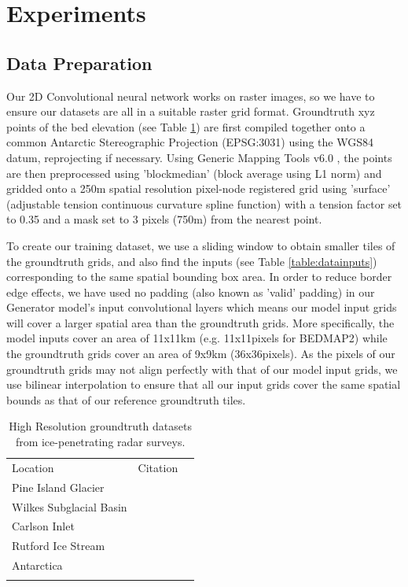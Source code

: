 \documentclass[tc, manuscript]{copernicus}
\begin{document}
\section{Experiments}

\subsection{Data Preparation}

Our 2D Convolutional neural network works on raster images, so we have to ensure our datasets are all in a suitable raster grid format.
Groundtruth xyz points of the bed elevation (see Table \ref{table:groundtruth}) are first compiled together onto a common Antarctic Stereographic Projection (EPSG:3031) using the WGS84 datum, reprojecting if necessary.
Using Generic Mapping Tools v6.0 \citep{WesselGenericMappingTools2019}, the points are then preprocessed using 'blockmedian' (block average using L1 norm) and gridded onto a 250m spatial resolution pixel-node registered grid using 'surface' (adjustable tension continuous curvature spline function) with a tension factor set to 0.35 and a mask set to 3 pixels (750m) from the nearest point.

To create our training dataset, we use a sliding window to obtain smaller tiles of the groundtruth grids, and also find the inputs (see Table \ref{table:datainputs}) corresponding to the same spatial bounding box area.
In order to reduce border edge effects, we have used no padding (also known as 'valid' padding) in our Generator model's input convolutional layers which means our model input grids will cover a larger spatial area than the groundtruth grids.
More specifically, the model inputs cover an area of 11x11km (e.g. 11x11pixels for BEDMAP2) while the groundtruth grids cover an area of 9x9km (36x36pixels).
As the pixels of our groundtruth grids may not align perfectly with that of our model input grids, we use bilinear interpolation to ensure that all our input grids cover the same spatial bounds as that of our reference groundtruth tiles.

\begin{table}[h]
\caption{High Resolution groundtruth datasets from ice-penetrating radar surveys.}
\label{table:groundtruth}
\begin{tabular}{lcr}
\tophline
Location & Citation \\
\middlehline
Pine Island Glacier & \cite{BinghamDiverselandscapesPine2017} \\
Wilkes Subglacial Basin & \cite{JordanHypothesismegaoutburstflooding2010} \\
Carlson Inlet & \cite{KingIcestreamnot2011} \\
Rutford Ice Stream & \cite{KingSubglaciallandformsRutford2016} \\
Antarctica & \cite{ShiMultichannelCoherentRadar2010} \\
\bottomhline
\end{tabular}
\belowtable{} %
\end{table}
\end{document}
